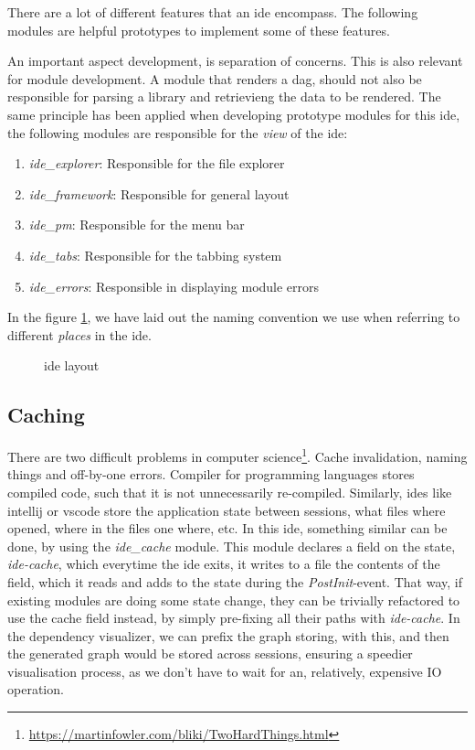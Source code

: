 There are a lot of different features that an \gls{ide} encompass. The following
modules are helpful prototypes to implement some of these features.

An important aspect development, is separation of concerns. This is also
relevant for module development. A module that renders a \gls{dag}, should not
also be responsible for parsing a library and retrievieng the data to be
rendered. The same principle has been applied when developing prototype modules
for this \gls{ide}, the following modules are responsible for the \textit{view}
of the \gls{ide}:

\begin{enumerate}
  \item \textit{ide\_explorer}: Responsible for the file explorer
  \item \textit{ide\_framework}: Responsible for general layout
  \item \textit{ide\_pm}: Responsible for the menu bar
  \item \textit{ide\_tabs}: Responsible for the tabbing system
  \item \textit{ide\_errors}: Responsible in displaying module errors
\end{enumerate}

In the figure \ref{fig:ideLayout}, we have laid out the naming convention we
use when referring to different \textit{places} in the \gls{ide}.

\begin{figure}
  \centering
  
  \caption{\gls{ide} layout}
  \label{fig:ideLayout}
\end{figure}

\subsection{Caching}

There are two difficult problems in computer science\footnote{\url{https://martinfowler.com/bliki/TwoHardThings.html}}.
Cache invalidation, naming things and off-by-one errors. Compiler for
programming languages stores compiled code, such that it is not unnecessarily
re-compiled. Similarly, \gls{ide}s like \gls{intellij} or \gls{vscode} store the
application state between sessions, what files where opened, where in the files
one where, etc. In this \gls{ide}, something similar can be done, by using the
\textit{ide\_cache} module. This module declares a field on the state,
\textit{ide-cache}, which everytime the \gls{ide} exits, it writes to a file the
contents of the field, which it reads and adds to the state during the
\textit{PostInit}-event. That way, if existing modules are doing some state
change, they can be trivially refactored to use the cache field instead, by
simply pre-fixing all their paths with \textit{ide-cache}. In the dependency
visualizer, we can prefix the graph storing, with this, and then the generated
graph would be stored across sessions, ensuring a speedier visualisation
process, as we don't have to wait for an, relatively, expensive IO operation.

